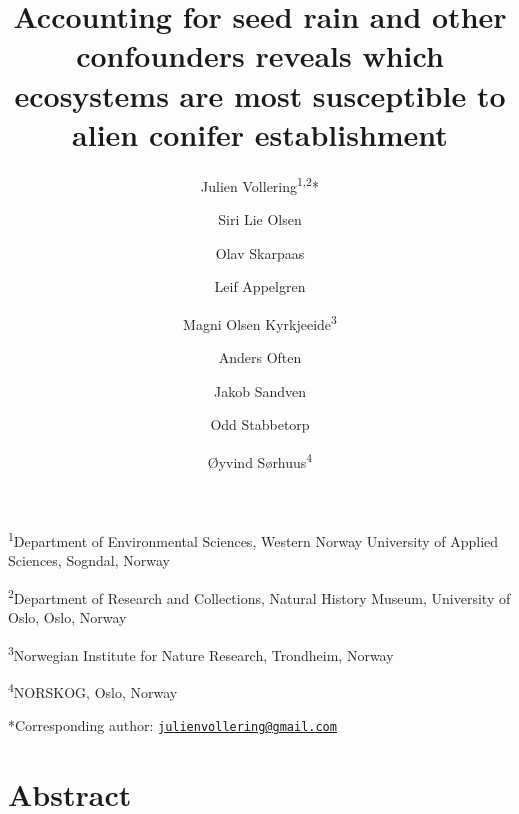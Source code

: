\documentclass[
]{article}
\title{Accounting for seed rain and other confounders reveals which ecosystems are most susceptible to alien conifer establishment}
\author{Julien Vollering\textsuperscript{1,2}* \and Siri Lie Olsen \and Olav Skarpaas \and Leif Appelgren \and Magni Olsen Kyrkjeeide\textsuperscript{3} \and Anders Often \and Jakob Sandven \and Odd Stabbetorp \and Øyvind Sørhuus\textsuperscript{4}}
\date{}
\begin{document}
\maketitle

\textsuperscript{1}Department of Environmental Sciences, Western Norway University of Applied Sciences, Sogndal, Norway

\textsuperscript{2}Department of Research and Collections, Natural History Museum, University of Oslo, Oslo, Norway

\textsuperscript{3}Norwegian Institute for Nature Research, Trondheim, Norway

\textsuperscript{4}NORSKOG, Oslo, Norway

*Corresponding author: \href{mailto:julienvollering@gmail.com}{\nolinkurl{julienvollering@gmail.com}}

\hypertarget{abstract}{%
\section{Abstract}\label{abstract}}
\end{document}
